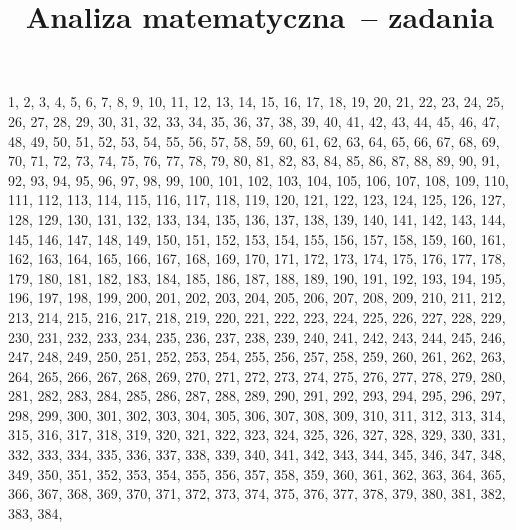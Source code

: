 \documentclass[a4paper,11pt]{article}
\title{Analiza matematyczna~-- zadania}
\begin{document}





\maketitle %







1, 2, 3, 4, 5, 6, 7, 8, 9, 10, 11, 12, 13, 14, 15, 16, 17, 18, 19, 20,
21, 22, 23, 24, 25, 26, 27, 28, 29, 30, 31, 32, 33, 34, 35, 36, 37,
38, 39, 40, 41, 42, 43, 44, 45, 46, 47, 48, 49, 50, 51, 52, 53, 54,
55, 56, 57, 58, 59, 60, 61, 62, 63, 64, 65, 66, 67, 68, 69, 70, 71,
72, 73, 74, 75, 76, 77, 78, 79, 80, 81, 82, 83, 84, 85, 86, 87, 88,
89, 90, 91, 92, 93, 94, 95, 96, 97, 98, 99, 100, 101, 102, 103, 104,
105, 106, 107, 108, 109, 110, 111, 112, 113, 114, 115, 116, 117, 118,
119, 120, 121, 122, 123, 124, 125, 126, 127, 128, 129, 130, 131, 132,
133, 134, 135, 136, 137, 138, 139, 140, 141, 142, 143, 144, 145, 146,
147, 148, 149, 150, 151, 152, 153, 154, 155, 156, 157, 158, 159, 160,
161, 162, 163, 164, 165, 166, 167, 168, 169, 170, 171, 172, 173, 174,
175, 176, 177, 178, 179, 180, 181, 182, 183, 184, 185, 186, 187, 188,
189, 190, 191, 192, 193, 194, 195, 196, 197, 198, 199, 200, 201, 202,
203, 204, 205, 206, 207, 208, 209, 210, 211, 212, 213, 214, 215, 216,
217, 218, 219, 220, 221, 222, 223, 224, 225, 226, 227, 228, 229, 230,
231, 232, 233, 234, 235, 236, 237, 238, 239, 240, 241, 242, 243, 244,
245, 246, 247, 248, 249, 250, 251, 252, 253, 254, 255, 256, 257, 258,
259, 260, 261, 262, 263, 264, 265, 266, 267, 268, 269, 270, 271, 272,
273, 274, 275, 276, 277, 278, 279, 280, 281, 282, 283, 284, 285, 286,
287, 288, 289, 290, 291, 292, 293, 294, 295, 296, 297, 298, 299, 300,
301, 302, 303, 304, 305, 306, 307, 308, 309, 310, 311, 312, 313, 314,
315, 316, 317, 318, 319, 320, 321, 322, 323, 324, 325, 326, 327, 328,
329, 330, 331, 332, 333, 334, 335, 336, 337, 338, 339, 340, 341, 342,
343, 344, 345, 346, 347, 348, 349, 350, 351, 352, 353, 354, 355, 356,
357, 358, 359, 360, 361, 362, 363, 364, 365, 366, 367, 368, 369, 370,
371, 372, 373, 374, 375, 376, 377, 378, 379, 380, 381, 382, 383, 384,
\end{document}
